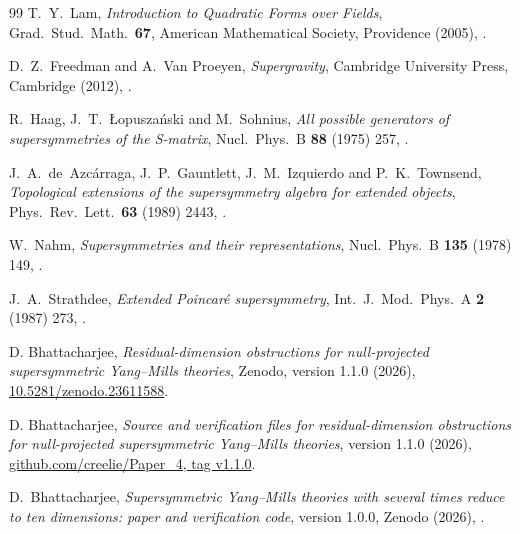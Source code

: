 \begin{thebibliography}{99}
T.~Y.~Lam, \textit{Introduction to Quadratic Forms over Fields}, Grad.\ Stud.\ Math.\ \textbf{67}, American Mathematical Society, Providence (2005), .

D.~Z.~Freedman and A.~Van Proeyen, \textit{Supergravity}, Cambridge University Press, Cambridge (2012), .

R.~Haag, J.~T.~{\L}opusza\'nski and M.~Sohnius, \textit{All possible generators of supersymmetries of the S-matrix}, Nucl.\ Phys.\ B \textbf{88} (1975) 257, .

J.~A.~de~Azc\'arraga, J.~P.~Gauntlett, J.~M.~Izquierdo and P.~K.~Townsend, \textit{Topological extensions of the supersymmetry algebra for extended objects}, Phys.\ Rev.\ Lett.\ \textbf{63} (1989) 2443, .

W.~Nahm, \textit{Supersymmetries and their representations}, Nucl.\ Phys.\ B \textbf{135} (1978) 149, .

J.~A.~Strathdee, \textit{Extended Poincar\'e supersymmetry}, Int.\ J.\ Mod.\ Phys.\ A \textbf{2} (1987) 273, .

D. Bhattacharjee, \emph{Residual-dimension obstructions for null-projected
supersymmetric Yang--Mills theories}, Zenodo, version 1.1.0 (2026),
\href{https://doi.org/10.5281/zenodo.23611588}{10.5281/zenodo.23611588}.

D. Bhattacharjee, \emph{Source and verification files for residual-dimension
obstructions for null-projected supersymmetric Yang--Mills theories},
version 1.1.0 (2026),
\href{https://github.com/creelie/Paper_4/tree/v1.1.0}{github.com/creelie/Paper\_4, tag v1.1.0}.

D.~Bhattacharjee, \textit{Supersymmetric Yang--Mills theories with several times reduce to ten dimensions: paper and verification code}, version 1.0.0, Zenodo (2026), .

\end{thebibliography}

